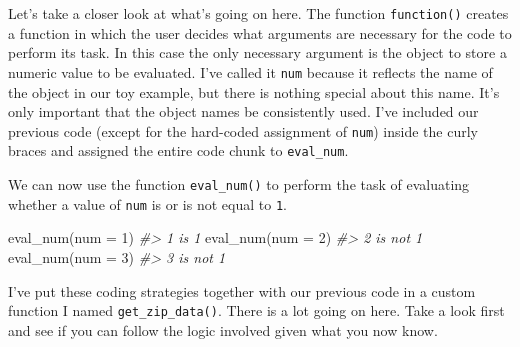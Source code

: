 \documentclass[
]{article}
\newenvironment{Shaded}{\begin{snugshade}}{\end{snugshade}}
\newcommand{\AttributeTok}[1]{\textcolor[rgb]{0.77,0.63,0.00}{#1}}
\newcommand{\CommentTok}[1]{\textcolor[rgb]{0.56,0.35,0.01}{\textit{#1}}}
\newcommand{\DecValTok}[1]{\textcolor[rgb]{0.00,0.00,0.81}{#1}}
\newcommand{\FunctionTok}[1]{\textcolor[rgb]{0.00,0.00,0.00}{#1}}
\newcommand{\NormalTok}[1]{#1}
\begin{document}
Let's take a closer look at what's going on here. The function \texttt{function()} creates a function in which the user decides what arguments are necessary for the code to perform its task. In this case the only necessary argument is the object to store a numeric value to be evaluated. I've called it \texttt{num} because it reflects the name of the object in our toy example, but there is nothing special about this name. It's only important that the object names be consistently used. I've included our previous code (except for the hard-coded assignment of \texttt{num}) inside the curly braces and assigned the entire code chunk to \texttt{eval\_num}.

We can now use the function \texttt{eval\_num()} to perform the task of evaluating whether a value of \texttt{num} is or is not equal to \texttt{1}.

\begin{Shaded}
\begin{Highlighting}[]
\FunctionTok{eval\_num}\NormalTok{(}\AttributeTok{num =} \DecValTok{1}\NormalTok{)}
\CommentTok{\#\textgreater{} 1 is 1}
\FunctionTok{eval\_num}\NormalTok{(}\AttributeTok{num =} \DecValTok{2}\NormalTok{)}
\CommentTok{\#\textgreater{} 2 is not 1}
\FunctionTok{eval\_num}\NormalTok{(}\AttributeTok{num =} \DecValTok{3}\NormalTok{)}
\CommentTok{\#\textgreater{} 3 is not 1}
\end{Highlighting}
\end{Shaded}

I've put these coding strategies together with our previous code in a custom function I named \texttt{get\_zip\_data()}. There is a lot going on here. Take a look first and see if you can follow the logic involved given what you now know.
\end{document}
